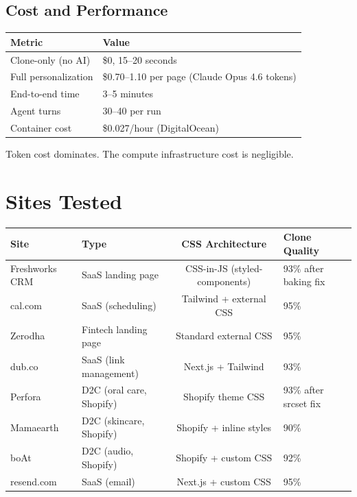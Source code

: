 \documentclass{article}
\begin{document}
\subsection{Cost and Performance}

\begin{center}
\begin{tabular}{ll}
\toprule
\textbf{Metric} & \textbf{Value} \\
\midrule
Clone-only (no AI) & \$0, 15--20 seconds \\
Full personalization & \$0.70--1.10 per page (Claude Opus 4.6 tokens) \\
End-to-end time & 3--5 minutes \\
Agent turns & 30--40 per run \\
Container cost & \$0.027/hour (DigitalOcean) \\
\bottomrule
\end{tabular}
\end{center}

Token cost dominates. The compute infrastructure cost is negligible.

\section{Sites Tested}

\begin{center}
\begin{tabularx}{\textwidth}{lXcl}
\toprule
\textbf{Site} & \textbf{Type} & \textbf{CSS Architecture} & \textbf{Clone Quality} \\
\midrule
Freshworks CRM & SaaS landing page & CSS-in-JS (styled-components) & 93\% after baking fix \\
cal.com & SaaS (scheduling) & Tailwind + external CSS & 95\% \\
Zerodha & Fintech landing page & Standard external CSS & 95\% \\
dub.co & SaaS (link management) & Next.js + Tailwind & 93\% \\
Perfora & D2C (oral care, Shopify) & Shopify theme CSS & 93\% after srcset fix \\
Mamaearth & D2C (skincare, Shopify) & Shopify + inline styles & 90\% \\
boAt & D2C (audio, Shopify) & Shopify + custom CSS & 92\% \\
resend.com & SaaS (email) & Next.js + custom CSS & 95\% \\
\bottomrule
\end{tabularx}
\end{center}
\end{document}
